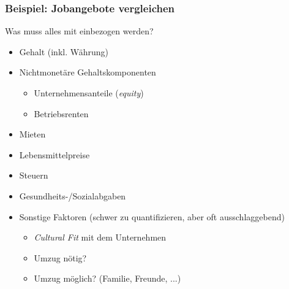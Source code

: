 \documentclass{beamer}
\begin{document}
\begin{frame}
  \frametitle{Beispiel: Jobangebote vergleichen}
  Was muss alles mit einbezogen werden?
  \begin{itemize}
  \item Gehalt (inkl. W\"ahrung)
  \item Nichtmonet\"are Gehaltskomponenten
    \begin{itemize}
    \item Unternehmensanteile (\emph{equity})
    \item Betriebsrenten
    \end{itemize}
  \item Mieten
  \item Lebensmittelpreise
  \item Steuern
  \item Gesundheits-/Sozialabgaben
  \item Sonstige Faktoren (schwer zu quantifizieren, aber oft ausschlaggebend)
    \begin{itemize}
    \item \emph{Cultural Fit} mit dem Unternehmen
    \item Umzug n\"otig?
    \item Umzug m\"oglich? (Familie, Freunde, ...)
    \end{itemize}
  \end{itemize}
\end{frame}
\end{document}
